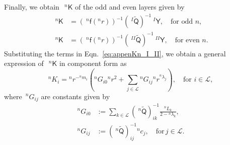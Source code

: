 \documentclass[preprint,10pt,times]{elsarticle}
\numberwithin{equation}{section}
\renewcommand{\u}[1]{\boldsymbol{#1}}
\newcommand{\usf}[1]{\u{\mathsf #1}}
\newcommand{\pr}[1]{\left( #1 \right)}
\renewcommand{\>}{$\Rightarrow$}
\begin{document}
Finally, we obtain~$~^{n}{\usf{K}}$ of the odd and even layers given by
\begin{subequations}
\begin{align}
	~^{n}{\usf{K}} & = (~^{n}\usf{f}({}^{n}\!r))^{-1} (~^{I}\tilde{\usf{Q}})^{-1}~^{I}\usf{Y}, \quad \text{for odd~$n$}, \\
	~^{n}{\usf{K}} & = (~^{n}\usf{f}({}^{n}\!r))^{-1} (~^{II}\tilde{\usf{Q}})^{-1}~^{II}\usf{Y}, \quad \text{for even~$n$}.
\end{align}
\label{eq:appenKn_I_II}
\end{subequations}
Substituting the terms in Eqn.~\eqref{eq:appenKn_I_II}, we obtain a general expression of~$~^{n}{\usf{K}}$ in component form as
\begin{equation}
{}^{n}\!{K_{i}} = {}^{n}\!{r}^{-{}^{n}\!{m_{i}}} \left( {}^{n}\!G_{i0} {}^{n} r^2 + \sum_{j \in \mathcal{L}} {}^{n}\!G_{ij} {}^{n}r^{{}^{n}\!{\lambda_{j}}} \right) , \quad \text{for~$i \in \mathcal{L}$},
\label{eq:appenKn}
\end{equation}
where~${}^{n}\!G_{ij}$ are constants given by
\begin{subequations}
\begin{align}
	{}^{n}\!G_{i0}& := \sum_{k \in \mathcal{L}} \pr{~^{n}\tilde{\usf{Q}}}^{-1}_{ik} \frac{{}^{n}\!L_{k}}{2 - {}^{n}\!\lambda_{k}}, \\
	{}^{n}\!G_{ij}& := \pr{~^{n}\tilde{\usf{Q}}}^{-1}_{ij} {}^{n}\!c_{j}, \quad \text{for}\, j\in \mathcal{L} .
\end{align}
\label{eq:Gjin}
\end{subequations}

\newpage


\end{document}
